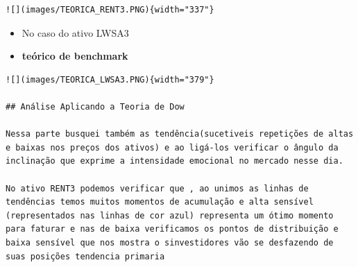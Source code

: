 \documentclass[
  letterpaper,
  DIV=11,
  numbers=noendperiod]{scrartcl}
\begin{document}
\begin{verbatim}
![](images/TEORICA_RENT3.PNG){width="337"}
\end{verbatim}

\begin{itemize}
\item
  No caso do ativo LWSA3
\item
  \textbf{teórico de benchmark}
\end{itemize}

\begin{verbatim}
![](images/TEORICA_LWSA3.PNG){width="379"}

## Análise Aplicando a Teoria de Dow 

Nessa parte busquei também as tendência(sucetiveis repetições de altas e baixas nos preços dos ativos) e ao ligá-los verificar o ângulo da inclinação que exprime a intensidade emocional no mercado nesse dia.

No ativo RENT3 podemos verificar que , ao unimos as linhas de tendências temos muitos momentos de acumulação e alta sensível (representados nas linhas de cor azul) representa um ótimo momento para faturar e nas de baixa verificamos os pontos de distribuição e baixa sensível que nos mostra o sinvestidores vão se desfazendo de suas posições tendencia primaria
\end{verbatim}
\end{document}
